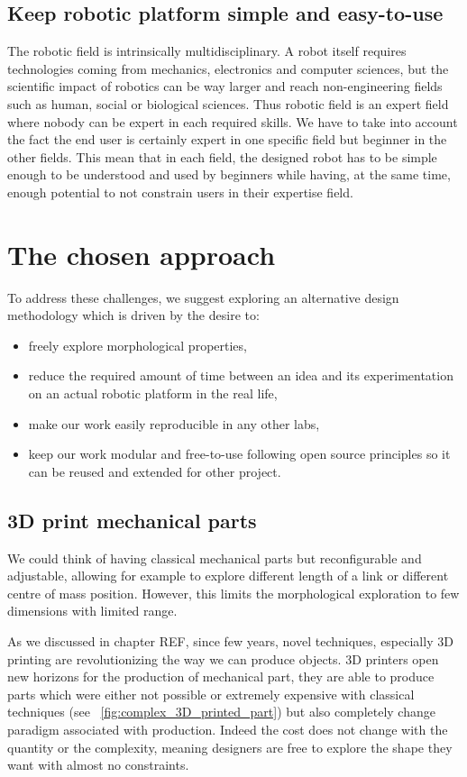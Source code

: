 \subsection{Keep robotic platform simple and easy-to-use} %
The robotic field is intrinsically multidisciplinary. A robot itself requires technologies coming from mechanics, electronics and computer sciences, but the scientific impact of robotics can be way larger and reach non-engineering fields such as human, social or biological sciences. Thus robotic field is an expert field where nobody can be expert in each required skills.
We have to take into account the fact the end user is certainly expert in one specific field but beginner in the other fields. This mean that in each field, the designed robot has to be simple enough to be understood and used by beginners while having, at the same time, enough potential to not constrain users in their expertise field.


\section{The chosen approach} %

To address these challenges, we suggest exploring an alternative design methodology which is driven by the desire to:
\begin{itemize}
    \item freely explore morphological properties,
    \item reduce the required amount of time between an idea and its experimentation on an actual robotic platform in the real life,
    \item make our work easily reproducible in any other labs,
    \item keep our work modular and free-to-use following open source principles so it can be reused and extended for other project.
\end{itemize}


\subsection{3D print mechanical parts} %
We could think of having classical mechanical parts but reconfigurable and adjustable, allowing for example to explore different length of a link or different centre of mass position. However, this limits the morphological exploration to few dimensions with limited range.

As we discussed in chapter REF, since few years, novel techniques, especially 3D printing are revolutionizing the way we can produce objects. 3D printers open new horizons for the production of mechanical part, they are able to produce parts which were either not possible or extremely expensive with classical techniques (see \figurename~\ref{fig:complex_3D_printed_part}) but also completely change paradigm associated with production. Indeed the cost does not change with the quantity or the complexity, meaning designers are free to explore the shape they want with almost no constraints.

